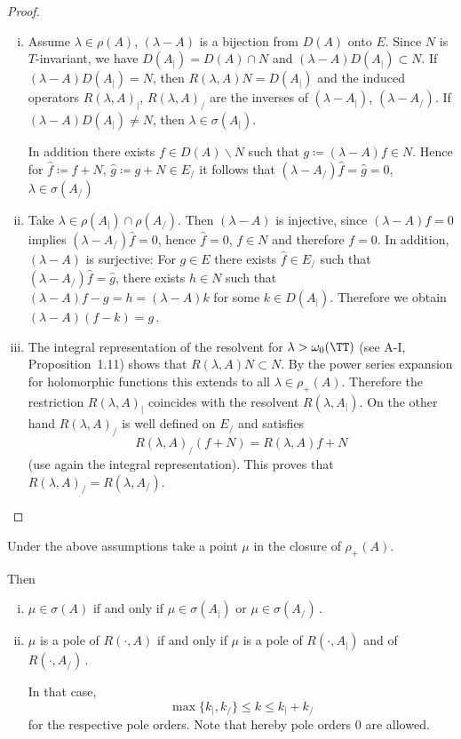 \begin{proof}
\begin{enumerate}[(i), wide]
\item 
Assume $\lambda \in \rho(A)$, \ie $(\lambda-A)$ is a bijection from $D(A)$ onto $E$.
Since $N$ is $T$-invariant, we have $D(A_{|}) = D(A) \cap N$ and $(\lambda-A)D(A_{|}) \subset N$.
If $(\lambda-A)D(A_{|}) = N$, then $R(\lambda,A)N = D(A_{|})$ and the induced operators $R(\lambda,A)_{|}$, \resp $R(\lambda,A)_{/}$ are the inverses of $(\lambda-A_{|})$, \resp $(\lambda-A_{/})$.
If $(\lambda-A)D(A_{|}) \neq N$, then $\lambda \in \sigma(A_{|})$.

In addition there exists $f \in D(A)\backslash N$ such that $g \coloneqq (\lambda-A)f \in N$.
Hence for $\hat{f} \coloneqq f+N$, $\hat{g} \coloneqq g+N \in E_{/}$ it follows that $(\lambda-A_{/})\hat{f} = \hat{g} = 0$, \ie $\lambda \in \sigma(A_{/})$

\item 
Take $\lambda \in \rho(A_{|}) \cap \rho(A_{/})$.
Then $(\lambda-A)$ is injective, since $(\lambda-A)f = 0$ implies $(\lambda-A_{/})\hat{f}= 0$, hence $\hat{f} = 0$, \ie $f \in N$ and therefore $f = 0$.
In addition, $(\lambda-A)$ is surjective: For $g \in E$ there exists $\hat{f} \in E_{/}$ such that $(\lambda-A_{/})\hat{f} = \hat{g}$, \ie there exists $h \in N$ such that $(\lambda-A)f - g = h = (\lambda-A)k$ for some $k \in D(A_{|})$.
Therefore we obtain $(\lambda-A)(f-k) = g$\,.

\item 
The integral representation of the resolvent for $\lambda > \omega_{0}(\TT)$ (see A-I, Proposition~1.11) shows that $R(\lambda,A)N \subset N$.
By the power series expansion for holomorphic functions this extends to all $\lambda \in \rho_{+}(A)$.
Therefore the restriction $R(\lambda,A)_{|}$ coincides with the resolvent $R(\lambda,A_{|})$.
On the other hand $R(\lambda,A)_{/}$ is well defined on $E_{/}$ and satisfies
\[
R(\lambda,A)_{/}(f+N) = R(\lambda,A)f + N
\]
(use again the integral representation).
This proves that $R(\lambda,A)_{/} = R(\lambda,A_{/})$.
\end{enumerate}
\end{proof}
\begin{corollary}\label{cor:a3-4.3}

Under the above assumptions take a point $\mu$ in the closure of $\rho_{+}(A)$.

Then
\begin{enumerate}[(i)]
\item 
$\mu \in \sigma(A)$ if and only if $\mu \in \sigma(A_{|})$ or $\mu \in \sigma(A_{/})$\,.

\item 
$\mu$ is a pole of $R(\cdot,A)$ if and only if $\mu$ is a pole of $R(\cdot,A_{|})$ and of $R(\cdot,A_{/})$\,.

In that case,
\[
\max\{k_{|},k_{/}\} \leq k \leq k_{|} + k_{/}
\]
for the respective pole orders. Note that hereby pole orders $0$ are allowed.
\end{enumerate}
\end{corollary}

